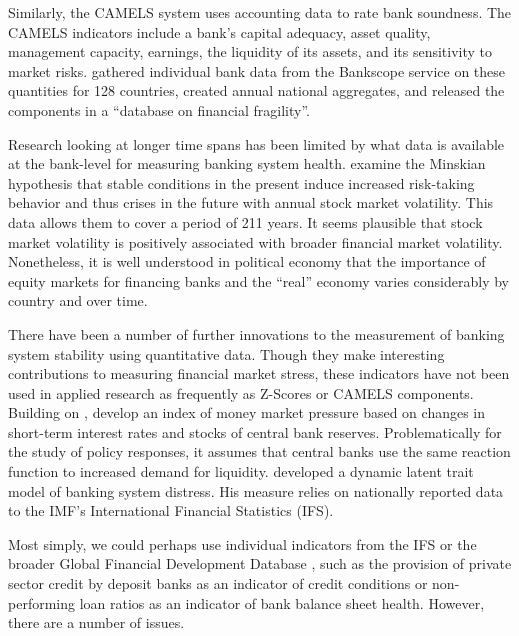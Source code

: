 \documentclass[]{article}
\begin{document}
Similarly, the CAMELS system uses accounting data to rate bank soundness. The CAMELS indicators include a bank's capital adequacy, asset quality, management capacity, earnings, the liquidity of its assets, and its sensitivity to market risks. \cite{Andrianova2015} gathered individual bank data from the Bankscope service on these quantities for 128 countries, created annual national aggregates, and released the components in a ``database on financial fragility''.

Research looking at longer time spans has been limited by what data is available at the bank-level for measuring banking system health. \cite{Danielsson2015} examine the Minskian \citeyearpar{Minsky1982} hypothesis that stable conditions in the present induce increased risk-taking behavior and thus crises in the future with annual stock market volatility. This data allows them to cover a period of 211 years. It seems plausible that stock market volatility is positively associated with broader financial market volatility. Nonetheless, it is well understood in political economy \citep[seminally][]{hall2001introduction} that the importance of equity markets for financing banks and the ``real'' economy varies considerably by country and over time.

There have been a number of further innovations to the measurement of banking system stability using quantitative data. Though they make interesting contributions to measuring financial market stress, these indicators have not been used in applied research as frequently as Z-Scores or CAMELS components. Building on \cite{vonHagen2007}, \cite{Jing2015} develop an index of money market pressure based on changes in short-term interest rates and stocks of central bank reserves. Problematically for the study of policy responses, it assumes that central banks use the same reaction function to increased demand for liquidity. \cite{Rosas2009dltm} developed a dynamic latent trait model of banking system distress. His measure relies on nationally reported data to the IMF's International Financial Statistics (IFS).

Most simply, we could perhaps use individual indicators from the IFS or the broader Global Financial Development Database \citep[GFDD,][]{worldbank2015}, such as the provision of private sector credit by deposit banks as an indicator of credit conditions or non-performing loan ratios as an indicator of bank balance sheet health. However, there are a number of issues.
\end{document}
